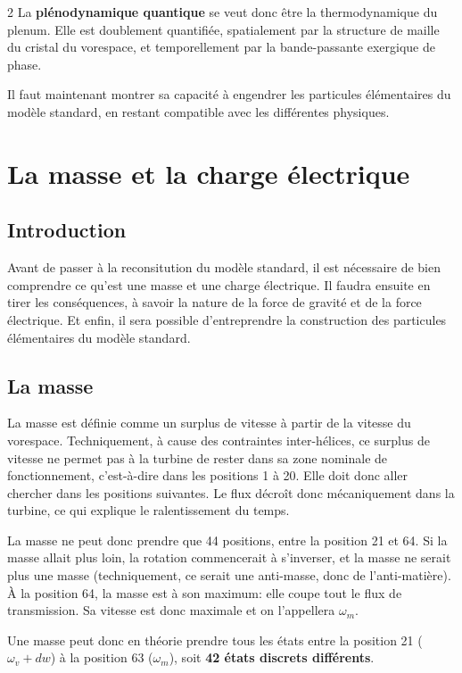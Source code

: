 \begin{multicols}{2}
La \textbf{plénodynamique quantique} se veut donc être la thermodynamique du
plenum. Elle est doublement quantifiée, spatialement par la structure
de maille du cristal du vorespace, et temporellement par la
bande-passante exergique de phase.

Il faut maintenant montrer sa capacité à engendrer les particules
élémentaires du modèle standard, en restant compatible avec les
différentes physiques.

\section{La masse et la charge électrique}

\subsection{Introduction}

Avant de passer à la reconsitution du modèle standard, il est nécessaire de bien
comprendre ce qu'est une masse et une charge électrique. Il faudra
ensuite en tirer les conséquences, à savoir la nature de la force de
gravité et de la force électrique. Et enfin, il sera
possible d'entreprendre la construction des particules élémentaires du
modèle standard.

\subsection{La masse}

La masse est définie comme un surplus de vitesse à partir de la
vitesse du vorespace. Techniquement, à cause des contraintes
inter-hélices, ce surplus de vitesse ne permet pas à la turbine de
rester dans sa zone nominale de fonctionnement, c'est-à-dire dans les positions 1 à
20. Elle doit donc aller chercher dans les positions suivantes. Le
flux décroît donc mécaniquement dans la turbine, ce qui explique le
ralentissement du temps.

La masse ne peut donc prendre que 44 positions, entre la position 21
et 64. Si la masse allait plus loin, la rotation commencerait à
s'inverser, et la masse ne serait plus une masse (techniquement, ce
serait une anti-masse, donc de l'anti-matière). À la position 64, la
masse est à son maximum: elle coupe tout le flux de transmission. Sa
vitesse est donc maximale et on l'appellera $\omega_m$.

Une masse peut donc en théorie prendre tous les états entre la
position 21 ($\omega_v + dw$) à la position 63 ($\omega_m$), soit \textbf{42 états discrets
différents}.
\medskip


\end{multicols}

